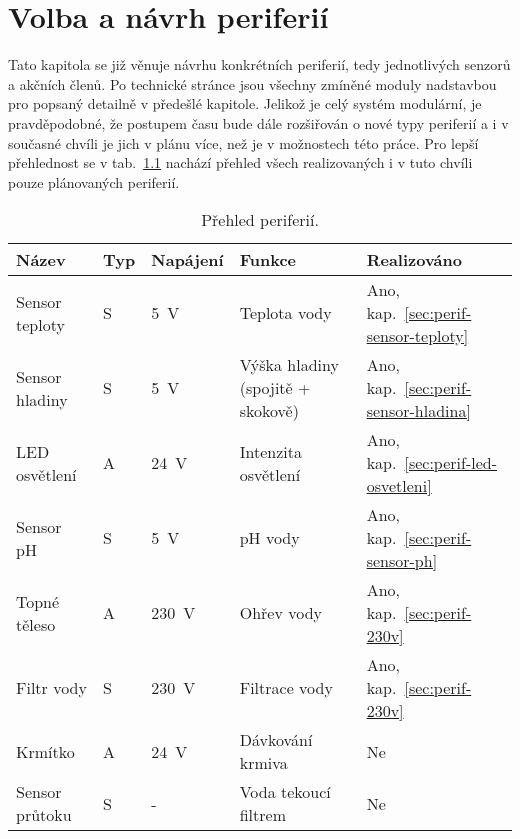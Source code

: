 \chapter{Volba a návrh periferií}
    Tato kapitola se již věnuje návrhu konkrétních periferií, tedy jednotlivých senzorů a akčních členů. Po technické stránce jsou všechny zmíněné moduly nadstavbou pro  popsaný detailně v předešlé kapitole. Jelikož je celý systém modulární, je pravděpodobné, že postupem času bude dále rozšiřován o nové typy periferií a i v současné chvíli je jich v plánu více, než je v možnostech této práce. Pro lepší přehlednost se v tab.~\ref{tab:prehled-periferii} nachází přehled všech realizovaných i v tuto chvíli pouze plánovaných periferií.

    \begin{table}[h]
        \centering
        \caption{Přehled periferií.}
        \label{tab:prehled-periferii}
        \begin{tabular}{|l|l|l|l|l|}
            \hline
            Název & Typ & Napájení & Funkce & Realizováno \\ \hline\hline
            Sensor teploty  & S & \qty{5}{V}    & Teplota vody                       & Ano, kap.~\ref{sec:perif-sensor-teploty}  \\ \hline
            Sensor hladiny  & S & \qty{5}{V}    & Výška hladiny (spojitě + skokově)  & Ano, kap.~\ref{sec:perif-sensor-hladina}  \\ \hline
            LED osvětlení   & A & \qty{24}{V}   & Intenzita osvětlení                & Ano, kap.~\ref{sec:perif-led-osvetleni}  \\ \hline
            Sensor pH       & S & \qty{5}{V}    & pH vody                            & Ano, kap.~\ref{sec:perif-sensor-ph}  \\ \hline
            Topné těleso    & A & \qty{230}{V}  & Ohřev vody                         & Ano, kap.~\ref{sec:perif-230v}  \\ \hline
            Filtr vody      & S & \qty{230}{V}  & Filtrace vody                      & Ano, kap.~\ref{sec:perif-230v}  \\ \hline
            Krmítko         & A & \qty{24}{V}   & Dávkování krmiva                   & Ne  \\ \hline
            Sensor průtoku  & S & -             & Voda tekoucí filtrem               & Ne  \\ \hline

\end{tabular}
\end{table}
